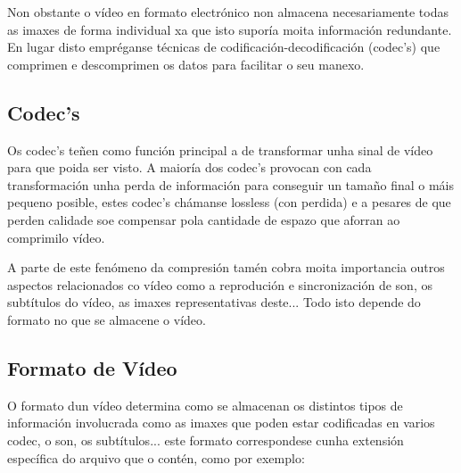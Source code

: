     Non obstante o vídeo en formato electrónico non almacena necesariamente todas as imaxes de forma
    individual xa que isto suporía moita información redundante. En lugar disto empréganse técnicas
    de codificación-decodificación (codec's) que comprimen e descomprimen os datos para facilitar o
    seu manexo.

    \subsection{Codec's}
        Os codec's teñen como función principal a de transformar unha sinal de vídeo para que poida
        ser visto. A maioría dos codec's provocan con cada transformación unha perda de información
        para conseguir un tamaño final o máis pequeno posible, estes codec's chámanse lossless (con 
        perdida) e a pesares de que perden calidade soe compensar pola cantidade de espazo que 
        aforran ao comprimilo vídeo.
        
        A parte de este fenómeno da compresión tamén cobra moita importancia outros aspectos 
        relacionados co vídeo como a reprodución e sincronización de son, os subtítulos do vídeo,
        as imaxes representativas deste... Todo isto depende do formato no que se almacene o vídeo.
        
    \subsection{Formato de Vídeo}
        O formato dun vídeo determina como se almacenan os distintos tipos de información involucrada
        como as imaxes que poden estar codificadas en varios codec, o son, os subtítulos...
        este formato correspondese cunha extensión específica do arquivo que o contén, como por 
        exemplo:
        
